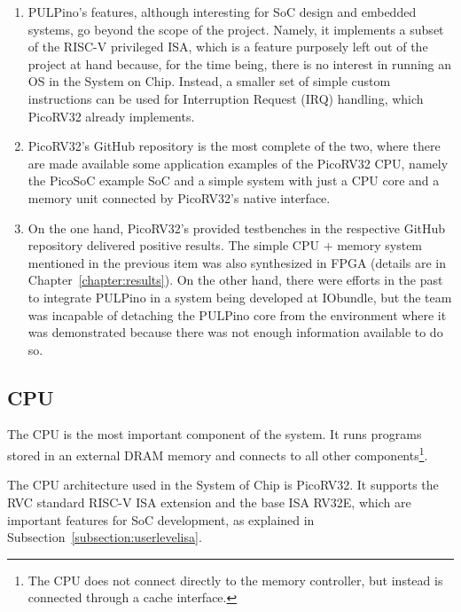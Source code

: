 \begin{enumerate}
	
\item PULPino's features, although interesting for SoC design and embedded
  systems, go beyond the scope of the project. Namely, it implements a subset of
  the RISC-V privileged ISA, which is a feature purposely left out of the
  project at hand because, for the time being, there is no interest in running
  an OS in the \socname System on Chip. Instead, a smaller set of simple custom
  instructions can be used for Interruption Request (IRQ) handling, which
  PicoRV32 already implements.

\item PicoRV32's GitHub repository is the most complete of the two, where there
  are made available some application examples of the PicoRV32 CPU, namely the
  PicoSoC example SoC and a simple system with just a CPU core and a memory unit
  connected by PicoRV32's native interface.

\item On the one hand, PicoRV32's provided testbenches in the respective GitHub
  repository delivered positive results. The simple CPU + memory system
  mentioned in the previous item was also synthesized in FPGA (details are in
  Chapter~\ref{chapter:results}). On the other hand, there were efforts in the
  past to integrate PULPino in a system being developed at IObundle, but the
  team was incapable of detaching the PULPino core from the environment where it
  was demonstrated because there was not enough information available to do so.

\end{enumerate}


\subsection{CPU}
\label{subsection:cpu}

The CPU is the most important component of the system. It runs programs stored
in an external DRAM memory and connects to all other components\footnote{The CPU
  does not connect directly to the memory controller, but instead is connected
  through a cache interface.}.

The CPU architecture used in the \socname System of Chip is PicoRV32. It
supports the RVC standard RISC-V ISA extension and the base ISA RV32E, which are
important features for SoC development, as explained in
Subsection~\ref{subsection:userlevelisa}.

